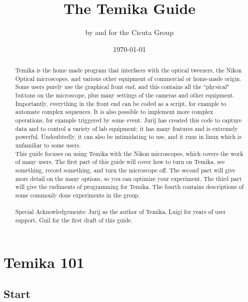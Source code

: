\documentclass{report}
\author{by and for the Cicuta Group}
\title{The Temika Guide}
\date{\today}
\begin{document}
\begin{minipage}{\textwidth}
\maketitle
\begin{abstract}
Temika is the home made program that interfaces with the optical tweezers, the Nikon Optical microscopes, and various other equipment of commercial or home-made origin.   Some users purely use the graphical front end, and this contains all the ``physical" buttons on the microscope, plus many settings of the cameras and other equipment.   Importantly, everything in the front end can be coded as a script, for example to automate complex sequences.   It is also possible to implement more complex operations, for example triggered by some event.   Jurij has created this code to capture data and to control a variety of lab equipment; it  has many features and is extremely powerful.    Undoubtedly, it can also be intimidating to use, and it runs in linux which is unfamiliar to some users.\\

This guide focuses on using Temika with the Nikon microscopes, which covers the work of many users.  The first part of this guide will cover how to turn on Temika, see something, record something, and turn the microscope off. The second part will give more detail on the many options, so you can optimize your experiment. The third part will give the rudiments of programming for Temika. The fourth contains descriptions of some commonly done experiments in the group.  \\
\vspace{0.5cm}\\
Special Acknowledgements: Jurij as the author of Temika, Luigi for years of user support, Guil for the first draft of this guide.
\end{abstract}
\end{minipage}

\tableofcontents






\chapter{Temika 101}

\section{Start}
\end{document}
